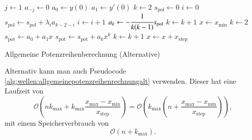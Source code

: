 \begin{algorithm}
	\begin{algorithmic}[1]
		\State $j \gets 1$
			\State $a_{-j} \gets 0$
		\EndFor
		\State $a_0 \gets y(0)$
		\State $a_1 \gets y'(0)$
		\State $k \gets 2$
			\State $s_{\text{pol}} \gets 0$
			\State $i \gets 0$
				\State $s_{\text{pol}} \gets s_{\text{pol}}+\lambda_i a_{k-2-i}$
				\State $i \gets i + 1$
			\EndFor
			\State $a_k \gets -\cfrac{1}{k(k-1)} s_{\text{pol}}$
			\State $k \gets k + 1$
		\EndFor
		\State $x \gets x_{\text{min}}$
			\State $k \gets 2$
			\State $s_{\text{pot}} \gets a_0 + a_1x$
				\State $s_{\text{pot}} \gets s_{\text{pot}} + a_k x^k$
				\State $k \gets k + 1$
			\EndFor
			\State $x \gets x + x_{\text{step}}$
		\EndFor
	\end{algorithmic}
	\caption{Allgemeine Potenzreihenberechnung (Alternative)} 
	\label{alg:wellen:allgemeinepotenzreihenrechnungalt}
\end{algorithm}

Alternativ kann man auch Pseudocode 
\ref{alg:wellen:allgemeinepotenzreihenrechnungalt} verwenden. Dieser hat eine 
Laufzeit von
\begin{equation*}
	\mathcal{O}
	\left(
		nk_{\text{max}} + k_{\text{max}} 
		\frac{x_{\text{max}}-x_{\text{min}}}{x_{\text{step}}}
	\right)
	=
	\mathcal{O}
	\left(
		k_{\text{max}}
		\left(
			n+\frac{x_{\text{max}}-x_{\text{min}}}{x_{\text{step}}}
		\right)
	\right),
\end{equation*}
mit einem Speicherverbrauch von
\begin{equation*}
	\mathcal{O}
	\left(
		n + k_{\text{max}}
	\right).
\end{equation*}